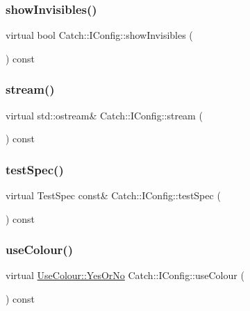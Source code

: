 \subsubsection{\texorpdfstring{showInvisibles()}{showInvisibles()}}
{\footnotesize\ttfamily virtual bool Catch\+::\+I\+Config\+::show\+Invisibles (\begin{DoxyParamCaption}{ }\end{DoxyParamCaption}) const\hspace{0.3cm}{\ttfamily [pure virtual]}}

\mbox{\label{struct_catch_1_1_i_config_aa4c3fe0825e7e6ebdcfa6abc7abf3617}} 
\subsubsection{\texorpdfstring{stream()}{stream()}}
{\footnotesize\ttfamily virtual std\+::ostream\& Catch\+::\+I\+Config\+::stream (\begin{DoxyParamCaption}{ }\end{DoxyParamCaption}) const\hspace{0.3cm}{\ttfamily [pure virtual]}}

\mbox{\label{struct_catch_1_1_i_config_a03a2fd8221d896d12bf3684ab2a03588}} 
\subsubsection{\texorpdfstring{testSpec()}{testSpec()}}
{\footnotesize\ttfamily virtual Test\+Spec const\& Catch\+::\+I\+Config\+::test\+Spec (\begin{DoxyParamCaption}{ }\end{DoxyParamCaption}) const\hspace{0.3cm}{\ttfamily [pure virtual]}}

\mbox{\label{struct_catch_1_1_i_config_a87ec19a6b486eb5b5015cf7738fee026}} 
\subsubsection{\texorpdfstring{useColour()}{useColour()}}
{\footnotesize\ttfamily virtual \mbox{\hyperlink{struct_catch_1_1_use_colour_a6aa78da0c2de7539bb9e3757e204a3f1}{Use\+Colour\+::\+Yes\+Or\+No}} Catch\+::\+I\+Config\+::use\+Colour (\begin{DoxyParamCaption}{ }\end{DoxyParamCaption}) const\hspace{0.3cm}{\ttfamily [pure virtual]}}

